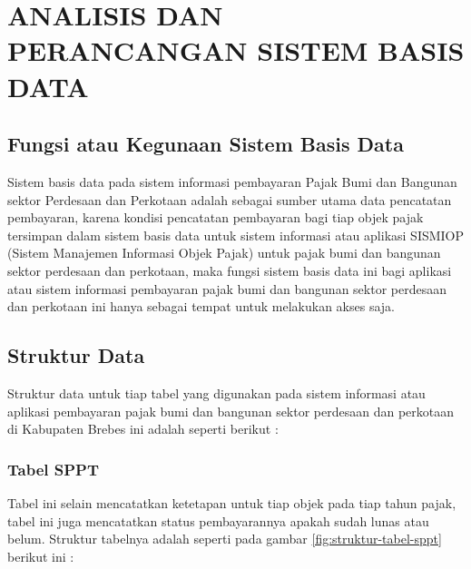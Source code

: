 \chapter{ANALISIS DAN PERANCANGAN SISTEM BASIS DATA}

\section{Fungsi atau Kegunaan Sistem Basis Data}

Sistem basis data pada sistem informasi pembayaran Pajak Bumi dan Bangunan sektor Perdesaan dan Perkotaan adalah sebagai sumber utama data pencatatan pembayaran, karena kondisi pencatatan pembayaran bagi tiap objek pajak tersimpan dalam sistem basis data untuk sistem informasi atau aplikasi SISMIOP (Sistem Manajemen Informasi Objek Pajak) untuk pajak bumi dan bangunan sektor perdesaan dan perkotaan, maka fungsi sistem basis data ini bagi aplikasi atau sistem informasi pembayaran pajak bumi dan bangunan sektor perdesaan dan perkotaan ini hanya sebagai tempat untuk melakukan akses saja.

\section{Struktur Data}

Struktur data untuk tiap tabel yang digunakan pada sistem informasi atau aplikasi pembayaran pajak bumi dan bangunan sektor perdesaan dan perkotaan di Kabupaten Brebes ini adalah seperti berikut :

\subsection{Tabel SPPT}

Tabel ini selain mencatatkan ketetapan untuk tiap objek pada tiap tahun pajak, tabel ini juga mencatatkan status pembayarannya apakah sudah lunas atau belum. Struktur tabelnya adalah seperti pada gambar \ref{fig:struktur-tabel-sppt} berikut ini :

